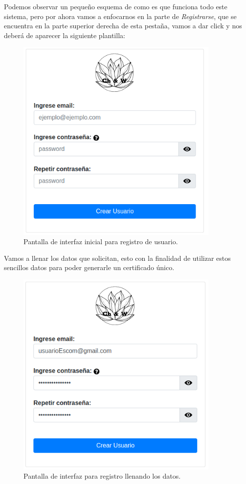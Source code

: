 \documentclass[12pt, a4paper, titlepage]{report}
\begin{document}
    	Podemos observar un pequeño esquema de como es que funciona todo este sistema, pero por ahora vamos a enfocarnos en la parte de \textit{Registrarse}, que se encuentra en la parte superior derecha de esta pestaña, vamos a dar click y nos deberá de aparecer la siguiente plantilla:
        	\begin{figure}[H]
        		\begin{center}	
        		\includegraphics[width=10cm]{./imagenes/Registro/UI_registro1.png}
        		\caption{Pantalla de interfaz inicial para registro de usuario.}
        		\label{fig:UI_registo1}
        		\end{center}
        	\end{figure}
        	Vamos a llenar los datos que solicitan, esto con la finalidad de utilizar estos sencillos datos para poder generarle un certificado único.
        	\begin{figure}[H]
        		\begin{center}	
        		\includegraphics[width=10cm]{./imagenes/Registro/Ext_registro1.png}
        		\caption{Pantalla de interfaz para registro llenando los datos.}
        		\label{fig:Ext_registo1_llenado}
        		\end{center}
        	\end{figure}
        	
\end{document}
